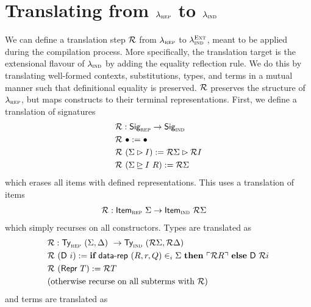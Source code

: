 \section{Translating from $\lambda_{\textsc{rep}}$ to $\lambda_{\textsc{ind}}$}



We can define a translation step $\mathcal{R}$ from $\lambda_{\textsc{rep}}$ to
$\lambda_{\textsc{ind}}^{\textsc{Ext}}$, meant to be applied during the compilation process.
More specifically, the translation target is the extensional flavour of
$\lambda_{\textsc{ind}}$ by adding the equality reflection rule. We do this by translating
well-formed contexts, substitutions, types, and terms in a mutual manner such
that definitional equality is preserved.
$\mathcal{R}$ preserves the structure of
$\lambda_{\textsc{rep}}$, but maps constructs to their terminal representations.
First, we define a translation of signatures
\begin{align*}
& \mathcal{R} : \textsf{Sig}_{\textsc{rep}} \to \textsf{Sig}_{\textsc{ind}} \\
& \mathcal{R}\ \bullet := \bullet \\
& \mathcal{R}\ (\Sigma \rhd I) := \mathcal{R} \Sigma \rhd \mathcal{R} I \\
& \mathcal{R}\ (\Sigma \unrhd I \ R) := \mathcal{R} \Sigma
\end{align*}
which erases all items with defined representations.
This uses a translation of items
\begin{align*}
& \mathcal{R} : \textsf{Item}_{\textsc{rep}}\ \Sigma \to \textsf{Item}_{\textsc{ind}}\ \mathcal{R} \Sigma
\end{align*}
which simply recurses on all constructors. Types are translated as
\begin{align*}
  & \mathcal{R} : \textsf{Ty}_{\textsc{rep}}\ (\Sigma, \Delta)\ \to \textsf{Ty}_{\textsc{ind}}\ (\mathcal{R} \Sigma, \mathcal{R} \Delta) \\
  & \mathcal{R}\ (\textsf{D}\ i) := \textbf{if}\ \textsf{data-rep}\ (R, r, Q) \in_i \Sigma\ \textbf{then}\ \ulcorner \mathcal{R} R \urcorner\ \textbf{else}\ \textsf{D}\ \mathcal{R} i \\
  & \mathcal{R}\ (\textsf{Repr}\ T) := \mathcal{R} T \\
  & \text{(otherwise recurse on all subterms with $\mathcal{R}$)}
\end{align*}
and terms are translated as
